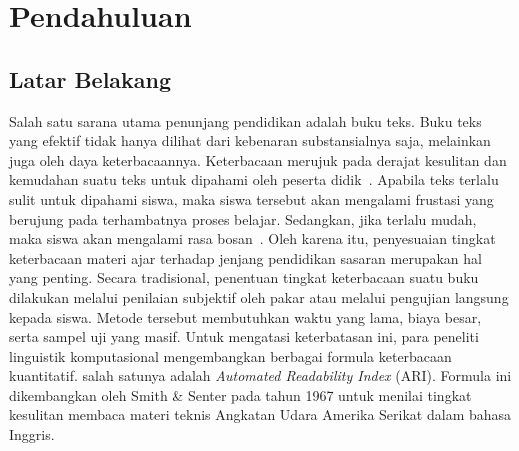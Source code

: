 \chapter{Pendahuluan}
\label{chap:intro}
   
\section{Latar Belakang}
\label{sec:label}

Salah satu sarana utama penunjang pendidikan adalah buku teks. Buku teks yang efektif tidak hanya dilihat dari kebenaran substansialnya saja, melainkan juga oleh daya keterbacaannya. Keterbacaan merujuk pada derajat kesulitan dan kemudahan suatu teks untuk dipahami oleh peserta didik~\cite{fadziah2017penerapan}. Apabila teks terlalu sulit untuk dipahami siswa, maka siswa tersebut akan mengalami frustasi yang berujung pada terhambatnya proses belajar. Sedangkan, jika terlalu mudah, maka siswa akan mengalami rasa bosan~\cite{novianto2024analisis}. Oleh karena itu, penyesuaian tingkat keterbacaan materi ajar terhadap jenjang pendidikan sasaran merupakan hal yang penting. Secara tradisional, penentuan tingkat keterbacaan suatu buku dilakukan melalui penilaian subjektif oleh pakar atau melalui pengujian langsung kepada siswa. Metode tersebut membutuhkan waktu yang lama, biaya besar, serta sampel uji yang masif. Untuk mengatasi keterbatasan ini, para peneliti linguistik komputasional mengembangkan berbagai formula keterbacaan kuantitatif. salah satunya adalah \textit{Automated Readability Index} (ARI). Formula ini dikembangkan oleh Smith \& Senter pada tahun 1967 untuk menilai tingkat kesulitan membaca materi teknis Angkatan Udara Amerika Serikat dalam bahasa Inggris.

